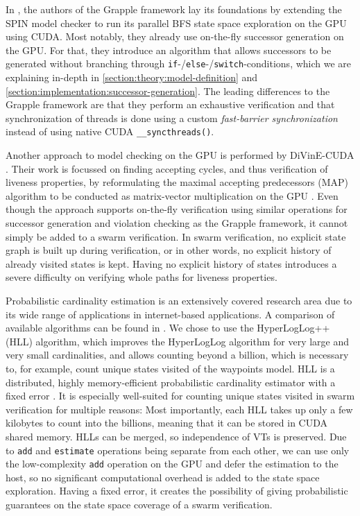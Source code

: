 \documentclass[
fancyheadings, %
%
%
]{stsreprt}
\begin{document}
In \cite{Bartocci2014.GPGPU-Parallel-SPIN}, the authors of the Grapple framework lay its foundations by extending the SPIN model checker to run its parallel BFS state space exploration \cite{Holzmann2012.Paralellizing-SPIN} on the GPU using CUDA.
Most notably, they already use on-the-fly successor generation on the GPU.
For that, they introduce an algorithm that allows successors to be generated without branching through \texttt{if}-/\texttt{else}-/\texttt{switch}-conditions, which we are explaining in-depth in \cref{section:theory:model-definition} and \cref{section:implementation:successor-generation}.
The leading differences to the Grapple framework are that they perform an exhaustive verification and that synchronization of threads is done using a custom \emph{fast-barrier synchronization} instead of using native CUDA \texttt{\_\_syncthreads()}.

Another approach to model checking on the GPU is performed by DiVinE-CUDA \cite{Barnat2009.DiVinE-CUDA}.
Their work is focussed on finding accepting cycles, and thus verification of liveness properties, by reformulating the maximal accepting predecessors (MAP) algorithm to be conducted as matrix-vector multiplication on the GPU \cite{Barnat2009}.
Even though the approach supports on-the-fly verification using similar operations for successor generation and violation checking as the Grapple framework, it cannot simply be added to a swarm verification.
In swarm verification, no explicit state graph is built up during verification, or in other words, no explicit history of already visited states is kept.
Having no explicit history of states introduces a severe difficulty on verifying whole paths for liveness properties.


Probabilistic cardinality estimation is an extensively covered research area due to its wide range of applications in internet-based applications.
A comparison of available algorithms can be found in \cite{Metwally2008}.
We chose to use the HyperLogLog++ (HLL) algorithm, which improves the HyperLogLog algorithm \cite{Flajolet2007.HyperLogLog} for very large and very small cardinalities, and allows counting beyond a billion, which is necessary to, for example, count unique states visited of the waypoints model.
HLL is a distributed, highly memory-efficient probabilistic cardinality estimator with a fixed error \cite{Heule2013.HyperLogLog++}.
It is especially well-suited for counting unique states visited in swarm verification for multiple reasons:
Most importantly, each HLL takes up only a few kilobytes to count into the billions, meaning that it can be stored in CUDA shared memory.
HLLs can be merged, so independence of VTs is preserved.
Due to \texttt{add} and \texttt{estimate} operations being separate from each other, we can use only the low-complexity \texttt{add} operation on the GPU and defer the estimation to the host, so no significant computational overhead is added to the state space exploration.
Having a fixed error, it creates the possibility of giving probabilistic guarantees on the state space coverage of a swarm verification.
\end{document}
